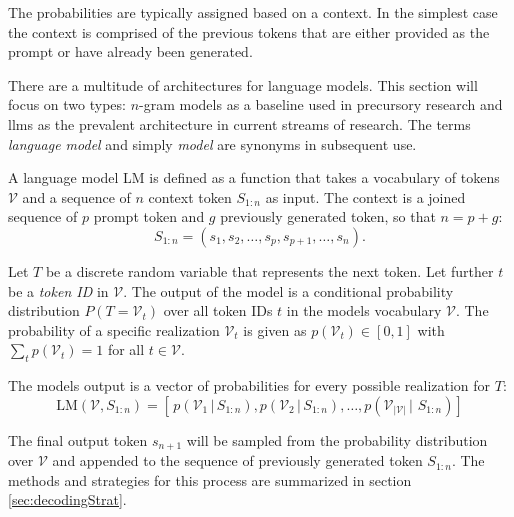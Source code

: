     The probabilities are typically assigned based on a context.
    In the simplest case the context is comprised of the previous tokens that are either provided as the prompt or have already been generated.

    There are a multitude of architectures for language models.
    This section will focus on two types: $n$-gram models as a baseline used in precursory research and \acfp{llm} as the prevalent architecture in current streams of research.
    The terms \emph{language model} and simply \emph{model} are synonyms in subsequent use.

    \begin{definition}
    \label{def:lm}
        A language model LM is defined as a function that takes a vocabulary of tokens $\mathcal{V}$ and a sequence of $n$ context token $S_{1:n}$ as input.
        The context is a joined sequence of $p$ prompt token and $g$ previously generated token, so that $n = p + g$:
        \begin{equation}
            S_{1:n} = ( s_{1}, s_{2}, \dots, s_{p}, s_{p+1}, \dots, s_{n} ) \text{.}
        \end{equation}

        Let $T$ be a discrete random variable that represents the next token.
        Let further $t$ be a \emph{token ID} in $\mathcal{V}$.
        The output of the model is a conditional probability distribution $P(T = \mathcal{V}_t)$ over all token IDs $t$ in the models vocabulary $\mathcal{V}$.
        The probability of a specific realization $\mathcal{V}_t$ is given as $p(\mathcal{V}_t) \in [0,1]$ with $\sum_t p(\mathcal{V}_t) = 1$ for all $t \in \mathcal{V}$.
        
        The models output is a vector of probabilities for every possible realization for $T$:
        \begin{equation}
            \mathrm{LM}(\mathcal{V}, S_{1:n}) = \left[ \, p(\mathcal{V}_1 \, | \, S_{1:n}), p(\mathcal{V}_2 \, | \, S_{1:n}), \dots, p(\mathcal{V}_{|\mathcal{V}|} \, | \, \, S_{1:n}) \right]
        \end{equation}
    \end{definition}

    The final output token $s_{n+1}$ will be sampled from the probability distribution over $\mathcal{V}$ and appended to the sequence of previously generated token $S_{1:n}$.
    The methods and strategies for this process are summarized in section \ref{sec:decodingStrat}.

